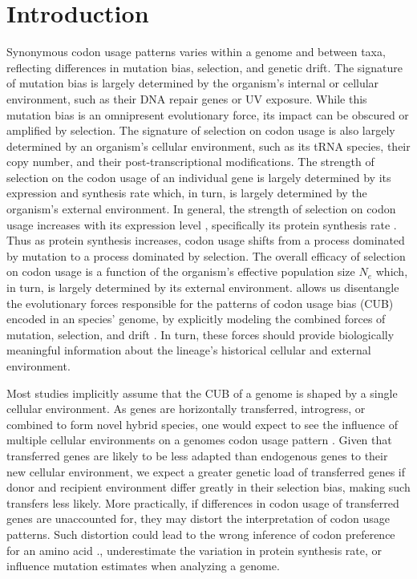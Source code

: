 \documentclass[fleqn,letterpaper]{article}
\begin{document}
\section*{Introduction}
Synonymous codon usage patterns varies within a genome and between taxa, reflecting differences in mutation bias, selection, and genetic drift.
The signature of mutation bias is largely determined by the organism's internal or cellular environment, such as their DNA repair genes or UV exposure.
While this mutation bias is an omnipresent evolutionary force, its impact can be obscured or amplified by selection. 
The signature of selection on codon usage is also largely determined by an organism's cellular environment, such as its tRNA species, their copy number, and their post-transcriptional modifications.
The strength of selection on the codon usage of an individual gene is largely determined by its expression and synthesis rate which, in turn, is largely determined by the organism's external environment.
In general, the strength of selection on codon usage increases with its expression level \citep{gouy1982, ikemura1985, bulmer1990}, specifically its protein synthesis rate \citep{gilchrist2007}.
Thus as protein synthesis increases, codon usage shifts from a process dominated by mutation to a process dominated by selection.
The overall efficacy of selection on codon usage is a function of the organism's effective population size $N_e$ which, in turn, is largely determined by its external environment.
\ROC allows us disentangle the evolutionary forces responsible for the patterns of codon usage bias (CUB) encoded in an species' genome, by explicitly modeling the combined forces of mutation, selection, and drift \citep{gilchrist2007, ShahAndGilchrist2011, wallace2013, gilchrist2015}.
In turn, these forces should provide biologically meaningful information about the lineage's historical cellular and external environment.

Most studies implicitly assume that the CUB of a genome is shaped by a single cellular environment. 
As genes are horizontally transferred, introgress, or combined to form novel hybrid species, one would expect to see the influence of multiple cellular environments on a genomes codon usage pattern \citep{medigue1991, lawrence1997}.
Given that transferred genes are likely to be less adapted than endogenous genes to their new cellular environment, we expect a greater genetic load of transferred genes if donor and recipient environment differ greatly in their selection bias, making such transfers less likely.
More practically, if differences in codon usage of transferred genes are unaccounted for, they may distort the interpretation of codon usage patterns.
Such distortion could lead to the wrong inference of codon preference for an amino acid \citep{ShahAndGilchrist2011, gilchrist2015}., underestimate the variation in protein synthesis rate, or influence mutation estimates when analyzing a genome.
\end{document}
